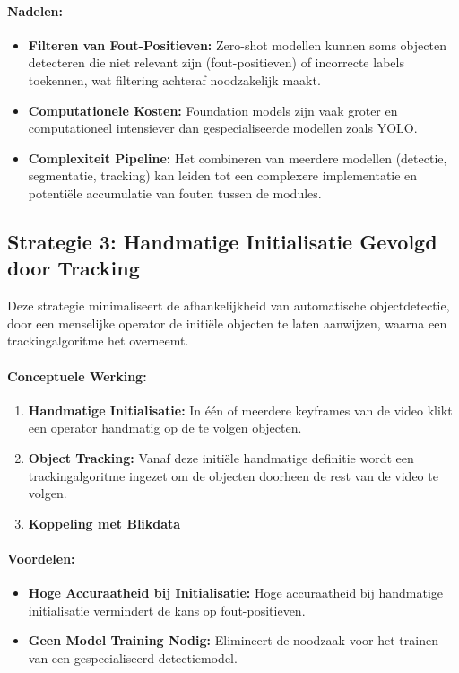 \paragraph{Nadelen:}
\begin{itemize}
    \item \textbf{Filteren van Fout-Positieven:} Zero-shot modellen kunnen soms objecten detecteren die niet relevant zijn (fout-positieven) of incorrecte labels toekennen, wat filtering achteraf noodzakelijk maakt.
    \item \textbf{Computationele Kosten:} Foundation models zijn vaak groter en computationeel intensiever dan gespecialiseerde modellen zoals YOLO.
    \item \textbf{Complexiteit Pipeline:} Het combineren van meerdere modellen (detectie, segmentatie, tracking) kan leiden tot een complexere implementatie en potentiële accumulatie van fouten tussen de modules.
\end{itemize}

\subsection{Strategie 3: Handmatige Initialisatie Gevolgd door Tracking}

Deze strategie minimaliseert de afhankelijkheid van automatische objectdetec\-tie, door een menselijke operator de initiële objecten te laten aanwijzen, waarna een trackingalgoritme het overneemt.

\paragraph{Conceptuele Werking:}
\begin{enumerate}
    \item \textbf{Handmatige Initialisatie:} In één of meerdere keyframes van de video klikt een operator handmatig op de te volgen objecten.
    \item \textbf{Object Tracking:} Vanaf deze initiële handmatige definitie wordt een trackingalgoritme ingezet om de objecten doorheen de rest van de video te volgen.
    \item \textbf{Koppeling met Blikdata}
\end{enumerate}

\paragraph{Voordelen:}
\begin{itemize}
    \item \textbf{Hoge Accuraatheid bij Initialisatie:} Hoge accuraatheid bij handmatige initialisatie vermindert de kans op fout-positieven.
    \item \textbf{Geen Model Training Nodig:} Elimineert de noodzaak voor het trainen van een gespecialiseerd detectiemodel.
\end{itemize}

